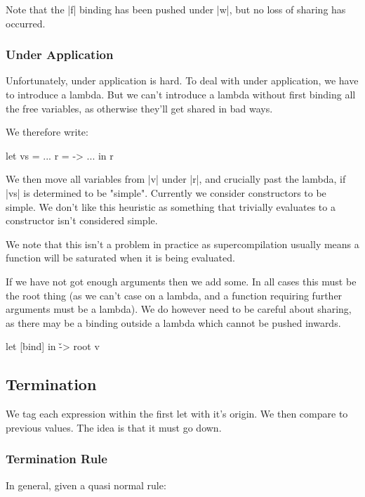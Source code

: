 \documentclass{sigplanconf}
\begin{document}
Note that the |f| binding has been pushed under |w|, but no loss of sharing has occurred.

\subsubsection{Under Application}

Unfortunately, under application is hard. To deal with under application, we have to introduce a lambda. But we can't introduce a lambda without first binding all the free variables, as otherwise they'll get shared in bad ways.

We therefore write:

\begin{code}
let vs  = ...
    r  = \x -> ...
in r
\end{code}

We then move all variables from |v| under |r|, and crucially past the lambda, if |vs| is determined to be "simple". Currently we consider constructors to be simple. We don't like this heuristic as something that trivially evaluates to a constructor isn't considered simple.

We note that this isn't a problem in practice as supercompilation usually means a function will be saturated when it is being evaluated.


If we have not got enough arguments then we add some. In all cases this must be the root thing (as we can't case on a lambda, and a function requiring further arguments must be a lambda). We do however need to be careful about sharing, as there may be a binding outside a lambda which cannot be pushed inwards.

\begin{code}
let [bind]
in \v -> root v
\end{code}


\subsection{Termination}
\label{sec:term}

We tag each expression within the first let with it's origin. We then compare to previous values. The idea is that it must go down.

\subsubsection{Termination Rule}

In general, given a quasi normal rule:
\end{document}
